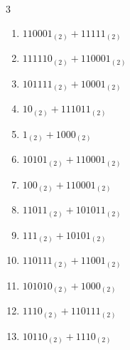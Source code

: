 \begin{multicols}{3}
\begin{enumerate}
  \item $110001_{(2)} + 11111_{(2)}$


  \item $111110_{(2)} + 110001_{(2)}$


  \item $101111_{(2)} + 10001_{(2)}$


  \item $10_{(2)} + 111011_{(2)}$


  \item $1_{(2)} + 1000_{(2)}$


  \item $10101_{(2)} + 110001_{(2)}$


  \item $100_{(2)} + 110001_{(2)}$


  \item $11011_{(2)} + 101011_{(2)}$


  \item $111_{(2)} + 10101_{(2)}$


  \item $110111_{(2)} + 11001_{(2)}$


\columnbreak %

\resetques

  \item $101010_{(2)} + 1000_{(2)}$


  \item $1110_{(2)} + 110111_{(2)}$


  \item $10110_{(2)} + 1110_{(2)}$



\end{enumerate}
\end{multicols}
